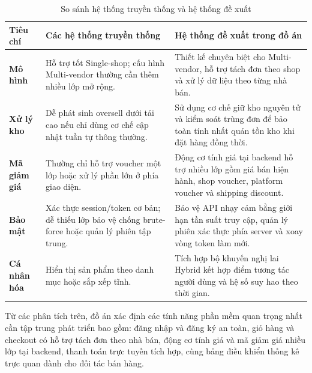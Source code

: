 \documentclass[../DoAn.tex]{subfiles}
\begin{document}
\begin{table}[H]
    \centering
    \caption{So sánh hệ thống truyền thống và hệ thống đề xuất}
    \label{table:survey}
    \begin{tabular}{|>{\raggedright\arraybackslash}p{2.0cm}|>{\raggedright\arraybackslash}p{5.6cm}|>{\raggedright\arraybackslash}p{5.9cm}|}
        \hline
        \textbf{Tiêu chí} & \textbf{Các hệ thống truyền thống} & \textbf{Hệ thống đề xuất trong đồ án} \\ \hline
        \textbf{Mô hình} & Hỗ trợ tốt Single-shop; cấu hình Multi-vendor thường cần thêm nhiều lớp mở rộng. & Thiết kế chuyên biệt cho Multi-vendor, hỗ trợ tách đơn theo shop và xử lý dữ liệu theo từng nhà bán. \\ \hline
        \textbf{Xử lý kho} & Dễ phát sinh oversell dưới tải cao nếu chỉ dùng cơ chế cập nhật tuần tự thông thường. & Sử dụng cơ chế giữ kho nguyên tử và kiểm soát trùng đơn để bảo toàn tính nhất quán tồn kho khi đặt hàng đồng thời. \\ \hline
        \textbf{Mã giảm giá} & Thường chỉ hỗ trợ voucher một lớp hoặc xử lý phần lớn ở phía giao diện. & Động cơ tính giá tại backend hỗ trợ nhiều lớp gồm giá bán hiện hành, shop voucher, platform voucher và shipping discount. \\ \hline
        \textbf{Bảo mật} & Xác thực session/token cơ bản; dễ thiếu lớp bảo vệ chống brute-force hoặc quản lý phiên tập trung. & Bảo vệ API nhạy cảm bằng giới hạn tần suất truy cập, quản lý phiên xác thực phía server và xoay vòng token làm mới. \\ \hline
        \textbf{Cá nhân hóa} & Hiển thị sản phẩm theo danh mục hoặc sắp xếp tĩnh. & Tích hợp bộ khuyến nghị lai Hybrid kết hợp điểm tương tác người dùng và hệ số suy hao theo thời gian. \\ \hline
    \end{tabular}
\end{table}

Từ các phân tích trên, đồ án xác định các tính năng phần mềm quan trọng nhất cần tập trung phát triển bao gồm: đăng nhập và đăng ký an toàn, giỏ hàng và checkout có hỗ trợ tách đơn theo nhà bán, động cơ tính giá và mã giảm giá nhiều lớp tại backend, thanh toán trực tuyến tích hợp, cùng bảng điều khiển thống kê trực quan dành cho đối tác bán hàng.
\end{document}
